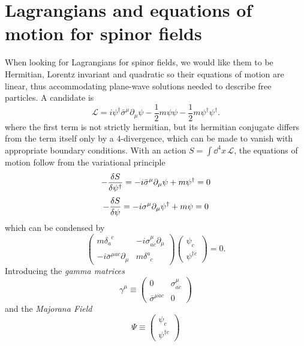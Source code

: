 \section{Lagrangians and equations of motion for spinor fields}
When looking for Lagrangians for spinor fields, we would like them to be Hermitian, Lorentz invariant and quadratic so their equations of motion are linear, thus accommodating plane-wave solutions needed to describe free particles. A candidate is
\begin{equation}
    \mathcal{L}=i\psi^\dagger\bar{\sigma}^\mu\partial_\mu\psi-\frac{1}{2}m\psi\psi-\frac{1}{2}m\psi^\dagger\psi^\dagger.
\end{equation}
where the first term is not strictly hermitian, but its hermitian conjugate differs from the term itself only by a 4-divergence, which can be made to vanish with appropriate boundary conditions. With an action $S=\int\dd^4x\,\mathcal{L}$, the equations of motion follow from the variational principle
\begin{equation}
    -\fdv{S}{\psi^\dagger}=-i\bar{\sigma}^\mu\partial_\mu\psi+m\psi^\dagger=0
\end{equation}
\begin{equation}
    -\fdv{S}{\psi}=-i{\sigma}^\mu\partial_\mu\psi^\dagger+m\psi=0
\end{equation}
which can be condensed by
\begin{equation}
\left(\begin{array}{cc}
m \delta_{a}^{\phantom{a}c} & -i \sigma_{a \dot{c}}^{\mu} \partial_{\mu} \\
-i \bar{\sigma}^{\mu \dot{a} c} \partial_{\mu} & m \delta^{\dot{a}}_{\phantom{a}\dot{c}}
\end{array}\right)\left(\begin{array}{c}
\psi_{c} \\
\psi^{\dagger \dot{c}}
\end{array}\right)=0.
\label{dirac_equation_matrix}
\end{equation}
Introducing the \textit{gamma matrices}
\begin{equation}
\gamma^{\mu} \equiv\left(\begin{array}{cc}
0 & \sigma_{a \dot{c}}^{\mu} \\
\bar{\sigma}^{\mu \dot{a} c} & 0
\end{array}\right)
\end{equation}
and the \textit{Majorana Field}
\begin{equation}
\Psi \equiv\left(\begin{array}{c}
\psi_{c} \\
\psi^{\dagger \dot{c}}
\end{array}\right)
\end{equation}
